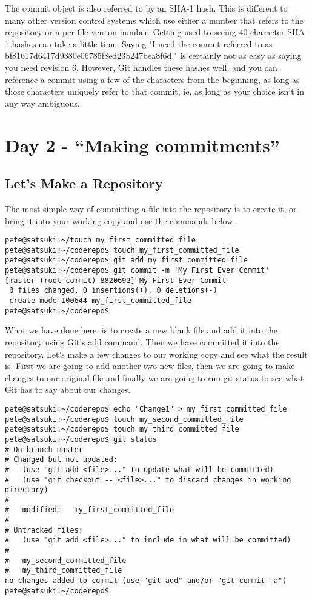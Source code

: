 The commit object is also referred to by an SHA-1 hash.  This is different to many other version control systems which use either a number that refers to the repository or a per file version number.  Getting used to seeing 40 character SHA-1 hashes can take a little time.  Saying "I need the commit referred to as  bf81617d6417d9380e06785f8ed23b247bea8f6d," is certainly not as easy as saying you need revision 6.  However, Git handles these hashes well, and you can reference a commit using a few of the characters from the beginning, as long as those characters uniquely refer to that commit, ie, as long as your choice isn't in any way ambiguous.

\section*{Day 2 - ``Making commitments''}
\subsection{Let's Make a Repository}

The most simple way of committing a file into the repository is to create it, or bring it into your working copy and use the commands below.

\begin{verbatim} 
pete@satsuki:~/touch my_first_committed_file
pete@satsuki:~/coderepo$ touch my_first_committed_file
pete@satsuki:~/coderepo$ git add my_first_committed_file
pete@satsuki:~/coderepo$ git commit -m 'My First Ever Commit'
[master (root-commit) 8820692] My First Ever Commit
 0 files changed, 0 insertions(+), 0 deletions(-)
 create mode 100644 my_first_committed_file
pete@satsuki:~/coderepo$
\end{verbatim} 

What we have done here, is to create a new blank file and add it into the repository using Git's add command.  Then we have committed it into the repository.  Let's make a few changes to our working copy and see what the result is.  First we are going to add another two new files, then we are going to make changes to our original file and finally we are going to run git status to see what Git has to say about our changes.

\begin{verbatim} 
pete@satsuki:~/coderepo$ echo "Change1" > my_first_committed_file 
pete@satsuki:~/coderepo$ touch my_second_committed_file
pete@satsuki:~/coderepo$ touch my_third_committed_file
pete@satsuki:~/coderepo$ git status
# On branch master
# Changed but not updated:
#   (use "git add <file>..." to update what will be committed)
#   (use "git checkout -- <file>..." to discard changes in working directory)
#
#	modified:   my_first_committed_file
#
# Untracked files:
#   (use "git add <file>..." to include in what will be committed)
#
#	my_second_committed_file
#	my_third_committed_file
no changes added to commit (use "git add" and/or "git commit -a")
pete@satsuki:~/coderepo$ 
\end{verbatim} 

